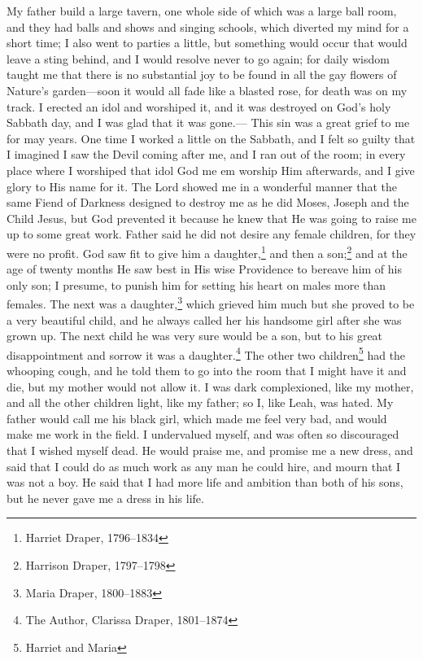 My father build a large tavern, one whole side of which was a large ball room, and they had balls and shows and singing schools, which diverted my mind for a short time; I also went to parties a little, but something would occur that would leave a sting behind, and I would resolve never to go again; for daily wisdom taught me that there is no substantial joy to be found in all the gay flowers of Nature's garden---soon it would all fade like a blasted rose, for death was on my track.
I erected an idol and worshiped it, and it was destroyed on God's holy Sabbath day, and I was glad that it was gone.---%
This sin was a great grief to me for may years.
One time I worked a little on the Sabbath, and I felt so guilty that I imagined I saw the Devil coming after me, and I ran out of the room; in every place where I worshiped that idol God me em worship Him afterwards, and I give glory to His name for it.
The Lord showed me in a wonderful manner that the same Fiend of Darkness designed to destroy me as he did Moses, Joseph and the Child Jesus, but God prevented it because he knew that He was going to raise me up to some great work.
Father said he did not desire any female children, for they%
\markpage%
were no profit.
God saw fit to give him a daughter,\footnote{Harriet Draper, 1796--1834} and then a son;\footnote{Harrison Draper, 1797--1798} and at the age of twenty months He saw best in His wise Providence to bereave him of his only son; I presume, to punish him for setting his heart on males more than females.
The next was a daughter,\footnote{Maria Draper, 1800--1883} which grieved him much but she proved to be a very beautiful child, and he always called her his handsome girl after she was grown up.
The next child he was very sure would be a son, but to his great disappointment and sorrow it was a daughter.\footnote{The Author, Clarissa Draper, 1801--1874}
The other two children\footnote{Harriet and Maria} had the whooping cough, and he told them to go into the room that I might have it and die, but my mother would not allow it.
I was dark complexioned, like my mother, and all the other children light, like my father; so I, like Leah, was hated.
My father would call me his black girl, which made me feel very bad, and would make me work in the field.
I undervalued myself, and was often so discouraged that I wished myself dead.
He would praise me, and promise me a new dress, and said that I could do as much work as any man he could hire, and mourn that I was not a boy.
He said that I had more life and ambition than both of his sons, but he never gave me a dress in his life.
